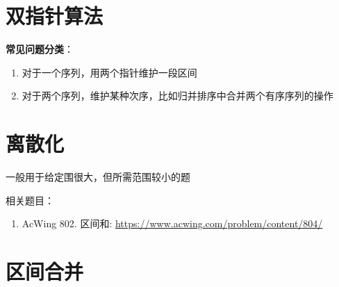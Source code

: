 \section{双指针算法}
\textbf{常见问题分类}：
\begin{enumerate}
    \item 对于一个序列，用两个指针维护一段区间 
    \item 对于两个序列，维护某种次序，比如归并排序中合并两个有序序列的操作  
\end{enumerate}


\section{离散化}
一般用于给定围很大，但所需范围较小的题


\ifshowLink
相关题目：
    \begin{enumerate}
        \item AcWing 802. 区间和: \href{https://www.acwing.com/problem/content/804/}{https://www.acwing.com/problem/content/804/}
    \end{enumerate}
\fi

\section{区间合并}

